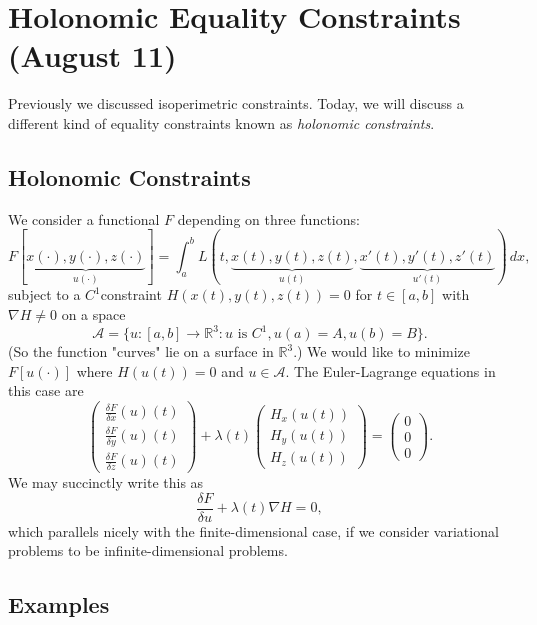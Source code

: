 \documentclass[11pt]{article}
\newcommand{\R}{\mathbb{R}}
\begin{document}
\section{Holonomic Equality Constraints (August 11)}

Previously we discussed isoperimetric constraints. Today, we will discuss a different kind of equality constraints known as \emph{holonomic constraints}.

\subsection{Holonomic Constraints}

We consider a functional $F$ depending on three functions:
\[
F[\underbrace{x(\cdot), y(\cdot), z(\cdot)}_{u(\cdot)}] = \int_a^b L(t, \underbrace{x(t), y(t), z(t)}_{u(t)}, \underbrace{x'(t), y'(t), z'(t)}_{u'(t)}) \, dx,
\]
subject to a $C^1$constraint $H(x(t),y(t),z(t)) = 0$ for $t \in [a, b]$ with $\nabla H \neq 0$ on a space 
\[
\mathcal{A} = \{ u : [a, b] \to \R^3 : u \text{ is } C^1, u(a) = A, u(b) = B \}.
\] 
(So the function "curves" lie on a surface in $\R^3$.) We would like to minimize $F[u(\cdot)]$ where $H(u(t)) = 0$ and $u \in \mathcal{A}$. The Euler-Lagrange equations in this case are
\[
\begin{pmatrix}
\frac{\delta F}{\delta x}(u)(t) \\
\frac{\delta F}{\delta y}(u)(t) \\
\frac{\delta F}{\delta z}(u)(t)
\end{pmatrix} + \lambda(t) \begin{pmatrix}
H_x(u(t)) \\
H_y(u(t)) \\
H_z(u(t))
\end{pmatrix} = \begin{pmatrix}
0 \\ 0 \\ 0
\end{pmatrix}.
\]
We may succinctly write this as
\[
\frac{\delta F}{\delta u} + \lambda (t) \nabla H = 0,
\]
which parallels nicely with the finite-dimensional case, if we consider variational problems to be infinite-dimensional problems.

\subsection{Examples}
\end{document}
